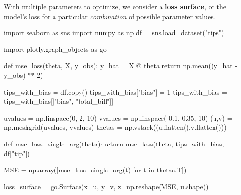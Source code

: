 \documentclass[
  letterpaper,
  DIV=11,
  numbers=noendperiod]{scrreprt}
\newenvironment{Shaded}{\begin{snugshade}}{\end{snugshade}}
\newcommand{\ControlFlowTok}[1]{\textcolor[rgb]{0.00,0.23,0.31}{#1}}
\newcommand{\DecValTok}[1]{\textcolor[rgb]{0.68,0.00,0.00}{#1}}
\newcommand{\FloatTok}[1]{\textcolor[rgb]{0.68,0.00,0.00}{#1}}
\newcommand{\ImportTok}[1]{\textcolor[rgb]{0.00,0.46,0.62}{#1}}
\newcommand{\KeywordTok}[1]{\textcolor[rgb]{0.00,0.23,0.31}{#1}}
\newcommand{\NormalTok}[1]{\textcolor[rgb]{0.00,0.23,0.31}{#1}}
\newcommand{\OperatorTok}[1]{\textcolor[rgb]{0.37,0.37,0.37}{#1}}
\newcommand{\StringTok}[1]{\textcolor[rgb]{0.13,0.47,0.30}{#1}}
\begin{document}
With multiple parameters to optimize, we consider a \textbf{loss
surface}, or the model's loss for a particular \emph{combination} of
possible parameter values.

\begin{Shaded}
\begin{Highlighting}[]
\ImportTok{import}\NormalTok{ seaborn }\ImportTok{as}\NormalTok{ sns}
\ImportTok{import}\NormalTok{ numpy }\ImportTok{as}\NormalTok{ np}
\NormalTok{df }\OperatorTok{=}\NormalTok{ sns.load\_dataset(}\StringTok{"tips"}\NormalTok{)}
\end{Highlighting}
\end{Shaded}

\begin{Shaded}
\begin{Highlighting}[]
\ImportTok{import}\NormalTok{ plotly.graph\_objects }\ImportTok{as}\NormalTok{ go}


\KeywordTok{def}\NormalTok{ mse\_loss(theta, X, y\_obs):}
\NormalTok{    y\_hat }\OperatorTok{=}\NormalTok{ X }\OperatorTok{@}\NormalTok{ theta}
    \ControlFlowTok{return}\NormalTok{ np.mean((y\_hat }\OperatorTok{{-}}\NormalTok{ y\_obs) }\OperatorTok{**} \DecValTok{2}\NormalTok{)    }

\NormalTok{tips\_with\_bias }\OperatorTok{=}\NormalTok{ df.copy()}
\NormalTok{tips\_with\_bias[}\StringTok{"bias"}\NormalTok{] }\OperatorTok{=} \DecValTok{1}
\NormalTok{tips\_with\_bias }\OperatorTok{=}\NormalTok{ tips\_with\_bias[[}\StringTok{"bias"}\NormalTok{, }\StringTok{"total\_bill"}\NormalTok{]]}

\NormalTok{uvalues }\OperatorTok{=}\NormalTok{ np.linspace(}\DecValTok{0}\NormalTok{, }\DecValTok{2}\NormalTok{, }\DecValTok{10}\NormalTok{)}
\NormalTok{vvalues }\OperatorTok{=}\NormalTok{ np.linspace(}\OperatorTok{{-}}\FloatTok{0.1}\NormalTok{, }\FloatTok{0.35}\NormalTok{, }\DecValTok{10}\NormalTok{)}
\NormalTok{(u,v) }\OperatorTok{=}\NormalTok{ np.meshgrid(uvalues, vvalues)}
\NormalTok{thetas }\OperatorTok{=}\NormalTok{ np.vstack((u.flatten(),v.flatten()))}

\KeywordTok{def}\NormalTok{ mse\_loss\_single\_arg(theta):}
    \ControlFlowTok{return}\NormalTok{ mse\_loss(theta, tips\_with\_bias, df[}\StringTok{"tip"}\NormalTok{])}

\NormalTok{MSE }\OperatorTok{=}\NormalTok{ np.array([mse\_loss\_single\_arg(t) }\ControlFlowTok{for}\NormalTok{ t }\KeywordTok{in}\NormalTok{ thetas.T])}

\NormalTok{loss\_surface }\OperatorTok{=}\NormalTok{ go.Surface(x}\OperatorTok{=}\NormalTok{u, y}\OperatorTok{=}\NormalTok{v, z}\OperatorTok{=}\NormalTok{np.reshape(MSE, u.shape))}


\end{Highlighting}
\end{Shaded}
\end{document}
